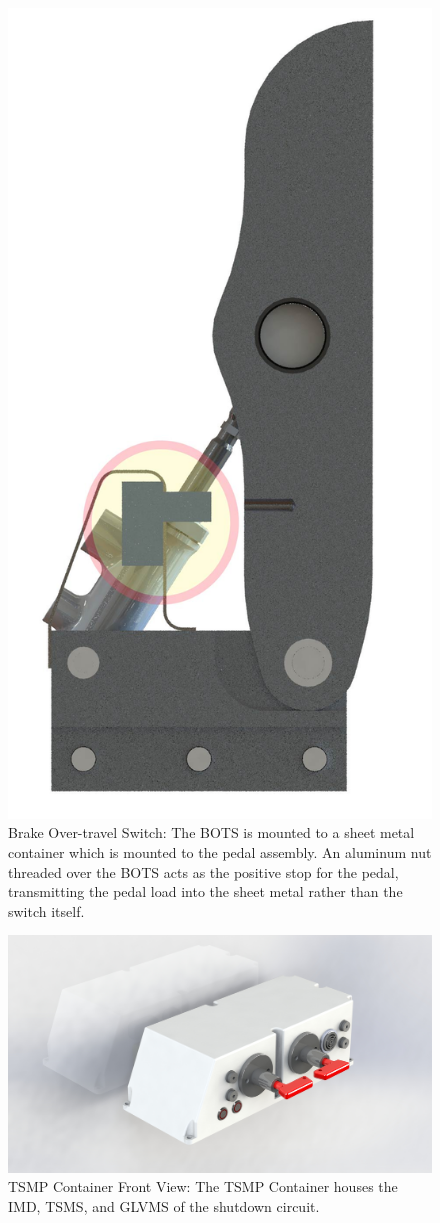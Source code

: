 \documentclass{article}
\begin{document}
\begin{figure}[H]
    \centering
    \includegraphics[width = 0.4 \textwidth]{BOTS}
    \caption{Brake Over-travel Switch: The BOTS is mounted to a sheet metal container which is mounted to the pedal assembly. An aluminum nut threaded over the BOTS acts as the positive stop for the pedal, transmitting the pedal load into the sheet metal rather than the switch itself.}
    \label{BOTS}
\end{figure}

\begin{figure}[H]
    \centering
    \includegraphics[width = 0.6 \textwidth]{TSMPcontainer1}
    \caption{TSMP Container Front View: The TSMP Container houses the IMD, TSMS, and GLVMS of the shutdown circuit.}
    \label{TSMPcontainer1}
\end{figure}
\end{document}
